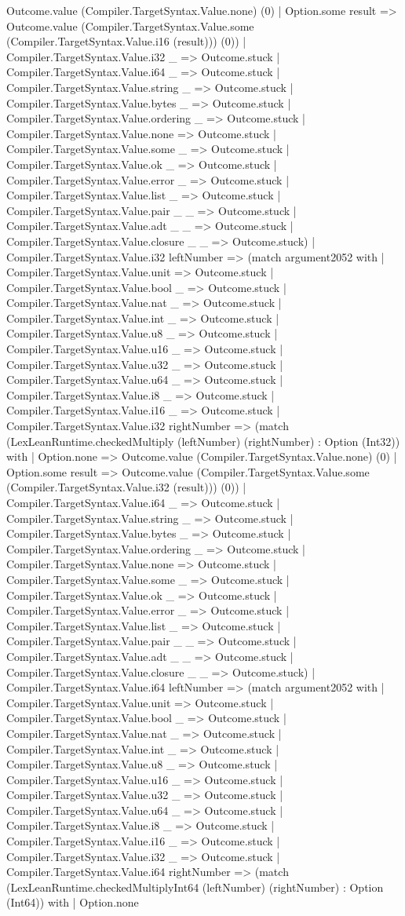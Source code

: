 \documentclass[11pt]{article}
\begin{document}
Outcome.value (Compiler.TargetSyntax.Value.none) (0) | Option.some result => Outcome.value (Compiler.TargetSyntax.Value.some (Compiler.TargetSyntax.Value.i16 (result))) (0)) | Compiler.TargetSyntax.Value.i32 \_ => Outcome.stuck | Compiler.TargetSyntax.Value.i64 \_ => Outcome.stuck | Compiler.TargetSyntax.Value.string \_ => Outcome.stuck | Compiler.TargetSyntax.Value.bytes \_ => Outcome.stuck | Compiler.TargetSyntax.Value.ordering \_ => Outcome.stuck | Compiler.TargetSyntax.Value.none => Outcome.stuck | Compiler.TargetSyntax.Value.some \_ => Outcome.stuck | Compiler.TargetSyntax.Value.ok \_ => Outcome.stuck | Compiler.TargetSyntax.Value.error \_ => Outcome.stuck | Compiler.TargetSyntax.Value.list \_ => Outcome.stuck | Compiler.TargetSyntax.Value.pair \_ \_ => Outcome.stuck | Compiler.TargetSyntax.Value.adt \_ \_ => Outcome.stuck | Compiler.TargetSyntax.Value.closure \_ \_ => Outcome.stuck) | Compiler.TargetSyntax.Value.i32 leftNumber => (match argument2052 with | Compiler.TargetSyntax.Value.unit => Outcome.stuck | Compiler.TargetSyntax.Value.bool \_ => Outcome.stuck | Compiler.TargetSyntax.Value.nat \_ => Outcome.stuck | Compiler.TargetSyntax.Value.int \_ => Outcome.stuck | Compiler.TargetSyntax.Value.u8 \_ => Outcome.stuck | Compiler.TargetSyntax.Value.u16 \_ => Outcome.stuck | Compiler.TargetSyntax.Value.u32 \_ => Outcome.stuck | Compiler.TargetSyntax.Value.u64 \_ => Outcome.stuck | Compiler.TargetSyntax.Value.i8 \_ => Outcome.stuck | Compiler.TargetSyntax.Value.i16 \_ => Outcome.stuck | Compiler.TargetSyntax.Value.i32 rightNumber => (match (LexLeanRuntime.checkedMultiply (leftNumber) (rightNumber) : Option (Int32)) with | Option.none => Outcome.value (Compiler.TargetSyntax.Value.none) (0) | Option.some result => Outcome.value (Compiler.TargetSyntax.Value.some (Compiler.TargetSyntax.Value.i32 (result))) (0)) | Compiler.TargetSyntax.Value.i64 \_ => Outcome.stuck | Compiler.TargetSyntax.Value.string \_ => Outcome.stuck | Compiler.TargetSyntax.Value.bytes \_ => Outcome.stuck | Compiler.TargetSyntax.Value.ordering \_ => Outcome.stuck | Compiler.TargetSyntax.Value.none => Outcome.stuck | Compiler.TargetSyntax.Value.some \_ => Outcome.stuck | Compiler.TargetSyntax.Value.ok \_ => Outcome.stuck | Compiler.TargetSyntax.Value.error \_ => Outcome.stuck | Compiler.TargetSyntax.Value.list \_ => Outcome.stuck | Compiler.TargetSyntax.Value.pair \_ \_ => Outcome.stuck | Compiler.TargetSyntax.Value.adt \_ \_ => Outcome.stuck | Compiler.TargetSyntax.Value.closure \_ \_ => Outcome.stuck) | Compiler.TargetSyntax.Value.i64 leftNumber => (match argument2052 with | Compiler.TargetSyntax.Value.unit => Outcome.stuck | Compiler.TargetSyntax.Value.bool \_ => Outcome.stuck | Compiler.TargetSyntax.Value.nat \_ => Outcome.stuck | Compiler.TargetSyntax.Value.int \_ => Outcome.stuck | Compiler.TargetSyntax.Value.u8 \_ => Outcome.stuck | Compiler.TargetSyntax.Value.u16 \_ => Outcome.stuck | Compiler.TargetSyntax.Value.u32 \_ => Outcome.stuck | Compiler.TargetSyntax.Value.u64 \_ => Outcome.stuck | Compiler.TargetSyntax.Value.i8 \_ => Outcome.stuck | Compiler.TargetSyntax.Value.i16 \_ => Outcome.stuck | Compiler.TargetSyntax.Value.i32 \_ => Outcome.stuck | Compiler.TargetSyntax.Value.i64 rightNumber => (match (LexLeanRuntime.checkedMultiplyInt64 (leftNumber) (rightNumber) : Option (Int64)) with | Option.none 
\end{document}
